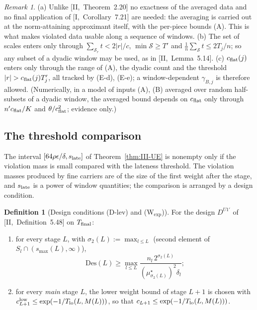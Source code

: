\documentclass[10pt]{amsart}
\theoremstyle{definition}
\newtheorem{definition}[theorem]{Definition}
\theoremstyle{remark}
\newtheorem{remark}[theorem]{Remark}
\begin{document}
\begin{remark}\label{rem:III-Eeng}
(a) Unlike [II,~Theorem~2.20] no exactness of the averaged data and no final
application of [I,~Corollary~7.21] are needed: the averaging is carried out at
the norm-attaining approximant itself, with the per-piece bounds (A).  This is
what makes violated data usable along a sequence of windows.  (b) The set of
scales enters only through $\sum_{\mathcal S_r}t<2|r|/c$, $\min\mathcal S\ge T'$
and $\frac1n\sum_{\mathcal S}t\le2T_j/n$; so any subset of a dyadic window may
be used, as in [II,~Lemma~5.14].  (c) $c_{\rm flat}(j)$ enters only through the
range of (A), the dyadic count and the threshold $|r|>c_{\rm flat}(j)T'_j$, all
tracked by (E-d), (E-e); a window-dependent $\gamma_{B,j}$ is therefore allowed.
(Numerically, in a model of inputs (A), (B) averaged over random half-subsets of a
dyadic window, the averaged bound depends on $c_{\rm flat}$ only through
$n'c_{\rm flat}/K$ and $\theta/c_{\rm flat}^2$; evidence only.)
\end{remark}

\subsection{The threshold comparison}\label{subsec:III-S2c}

The interval $[64\rho\epsilon/\delta,s_{\rm late}]$ of Theorem~\ref{thm:III-UE}
is nonempty only if the violation mass is small compared with the lateness
threshold.  The violation masses produced by fine carriers are of the size of the
first weight after the stage, and $s_{\rm late}$ is a power of window quantities;
the comparison is arranged by a design condition.

\begin{definition}[Design conditions (D-lev) and (W$_{\exp}$)]\label{def:III-designadd}
For the design $D^{U1'}$ of [II,~Definition~5.48] on $T_{\rm final}$:
\begin{enumerate}
\item[(D-lev)] for every stage $L$, with $\sigma_2(L):=\max_{l\le L}$ (second
element of $S_l\cap(s_{\max}(L),\infty)$),
\[
 \mathrm{Des}(L)\ge\max_{l\le L}\frac{n_l\,2^{\sigma_2(L)}}{(\mu^\star_{\sigma_2(L)})^2
 \delta_l} ;
\]
\item[(W$_{\exp}$)] for every \emph{main} stage $L$, the lower weight bound of stage
$L+1$ is chosen with $c^{\rm low}_{L+1}\le\exp(-1/T_{\rm lo}(L,M(L)))$, so that
$c_{L+1}\le\exp(-1/T_{\rm lo}(L,M(L)))$.
\end{enumerate}
\end{definition}
\end{document}
